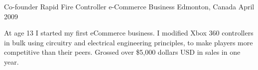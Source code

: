 

\begin{cventries}

  \cventry
    {Co-founder} %
    {Rapid Fire Controller e-Commerce Business} %
    {Edmonton, Canada} %
    {April 2009} %
    {
      \begin{cvitems} %
        \item {At age 13 I started my first eCommerce business. I modified Xbox 360 controllers in bulk using circuitry and electrical engineering principles, to make players more competitive than their peers. Grossed over \$5,000 dollars USD in sales in one year.}
      \end{cvitems}
    }
\end{cventries}
